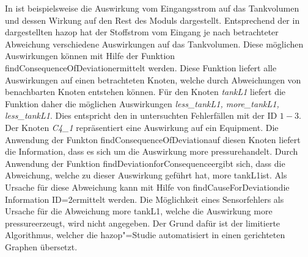 In  ist beispielsweise die Auswirkung vom Eingangsstrom auf das Tankvolumen und dessen Wirkung auf den Rest des Moduls dargestellt. Entsprechend der in  dargestellten \ac{hazop} hat der Stoffstrom vom Eingang je nach betrachteter Abweichung verschiedene Auswirkungen auf das Tankvolumen. Diese m\"oglichen Auswirkungen k\"onnen mit Hilfe der Funktion \glqq findConsequenceOfDeviation\grqq { }ermittelt werden. Diese Funktion liefert alle Auswirkungen auf einen betrachteten Knoten, welche durch Abweichungen von benachbarten Knoten entstehen k\"onnen. F\"ur den Knoten \textit{tankL1} liefert die Funktion daher die m\"oglichen Auswirkungen \textit{less{\_}tankL1, more{\_}tankL1, less{\_}tankL1}. Dies entspricht den in  untersuchten Fehlerf\"allen mit der ID $1-3$. \newline
Der Knoten \textit{C4{\_}1} repr\"asentiert eine Auswirkung auf ein Equipment. Die Anwendung der Funkton \glqq findConsequenceOfDeviation\grqq { }auf diesen Knoten liefert die Information, dass es sich um die Auswirkung \glqq more pressure\grqq { }handelt. Durch Anwendung der Funktion \glqq findDeviationforConsequence\grqq { }ergibt sich, dass die Abweichung, welche zu dieser Auswirkung gef\"uhrt hat, \glqq more tankL1\grqq { }ist. Als Ursache f\"ur diese Abweichung kann mit Hilfe von \glqq findCauseForDeviation\grqq { }die Information \glqq ID=2\grqq { }ermittelt werden. Die M\"oglichkeit eines Sensorfehlers als Ursache f\"ur die Abweichung \glqq more tankL1\grqq , welche die Auswirkung \glqq more pressure\grqq { }erzeugt, wird nicht angegeben. Der Grund daf\"ur ist der limitierte Algorithmus, welcher die \ac{hazop}"=Studie automatisiert in einen gerichteten Graphen \"ubersetzt. 

